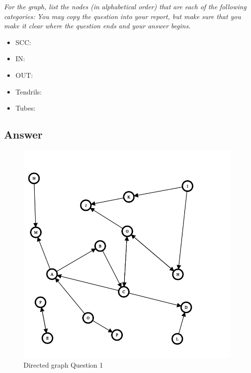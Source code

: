 \documentclass[12pt]{article}
\begin{document}
\emph{For the graph, list the nodes (in alphabetical order) that are each of the following categories:
}
\emph{You may copy the question into your report, but make sure that you make it clear where the question ends and your answer begins.} 
\newline
\newline
\newline
\newline
\begin{itemize}
    \item SCC:
    \item IN:
    \item OUT:
    \item Tendrils:
    \item Tubes:
\end{itemize}
\subsection*{Answer}

\begin{figure}[H]
    \centering
    \includegraphics[trim=0 10 0 80, clip, width=\textwidth] {graph.png}
    \caption{Directed graph Question 1 }
    \label{fig:direct graph}
\end{figure}
\end{document}
